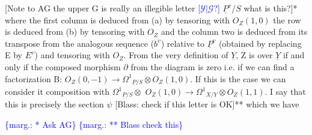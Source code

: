 \documentclass[11pt]{article}
\newcommand{\scanpage}[1]{\par\bigskip\noindent{\small\sffamily[scan #1]}\par}
\newcommand{\mspage}[1]{{\small\sffamily[p.\,#1]}}
\newcommand{\hand}[1]{\textcolor{blue}{#1}}
\newcommand{\margin}[1]{\textcolor{blue}{\{\textsf{marg.:} #1\}}}
\newcommand{\unsure}[1]{[#1?]}
\newenvironment{diagramblock}{\par\begin{center}}{\end{center}\par}
\begin{document}
\begin{diagramblock}
\end{diagramblock}

[Note to AG the upper G is really an illegible letter \hand{\unsure{$\mathcal{Y}$|$\mathcal{G}$}} $\underline{P}^{v}/S$
what is this?]*
where the first column is deduced from (a) by tensoring with
$O_Z(1,0)$ the row is deduced from (b) by tensoring with $O_Z$ and the
column two is deduced from its transpose from the analogous
sequence ($b^{v}$) relative to $\underline{P}^{v}$ (obtained by replacing E by $E^{v}$) and
tensoring with $O_Z$.  From the very definition of $\underline{Y}$, Z is over $\underline{Y}$ if
and only if the composed morphism $\partial$ from the diagram is zero i.e.
if we can find a factorization B: $O_Z(0,-1) \rightarrow \Omega^1{}_{\underline{P}/S} \otimes O_Z(1,0)$.  If
this is the case we can consider it composition with $\Omega^1{}_{\underline{P}/S} \otimes$
$O_Z(1,0) \rightarrow \Omega^1{}_{X/Y} \otimes O_Z(1,1)$.  I say that this is precisely the
section $\psi$ [Blass: check if this letter is OK]** which we have

\margin{* Ask AG}
\margin{** Blass check this}

\clearpage
\scanpage{24/47}
\mspage{47}
\end{document}
